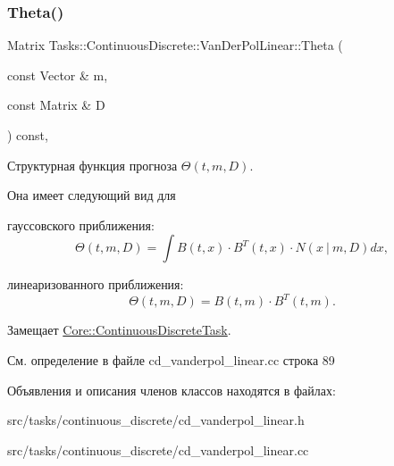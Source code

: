 \subsubsection{\texorpdfstring{Theta()}{Theta()}}
{\footnotesize\ttfamily Matrix Tasks\+::\+Continuous\+Discrete\+::\+Van\+Der\+Pol\+Linear\+::\+Theta (\begin{DoxyParamCaption}\item[{const Vector \&}]{m,  }\item[{const Matrix \&}]{D }\end{DoxyParamCaption}) const\hspace{0.3cm}{\ttfamily [override]}, {\ttfamily [virtual]}}



Структурная функция прогноза $\Theta(t,m,D)$. 

Она имеет следующий вид для


\begin{DoxyItemize}
\item гауссовского приближения\+: \[\Theta(t,m,D) = \int B(t,x)\cdot B^T(t,x)\cdot N(x\ |\ m,D)dx,\]
\item линеаризованного приближения\+: \[\Theta(t,m,D) = B(t,m)\cdot B^T(t,m).\] 
\end{DoxyItemize}

Замещает \hyperlink{class_core_1_1_continuous_discrete_task_a961cc49fd0c72ba0a211bb4913ca3ece}{Core\+::\+Continuous\+Discrete\+Task}.



См. определение в файле cd\+\_\+vanderpol\+\_\+linear.\+cc строка 89



Объявления и описания членов классов находятся в файлах\+:\begin{DoxyCompactItemize}
\item 
src/tasks/continuous\+\_\+discrete/cd\+\_\+vanderpol\+\_\+linear.\+h\item 
src/tasks/continuous\+\_\+discrete/cd\+\_\+vanderpol\+\_\+linear.\+cc\end{DoxyCompactItemize}
